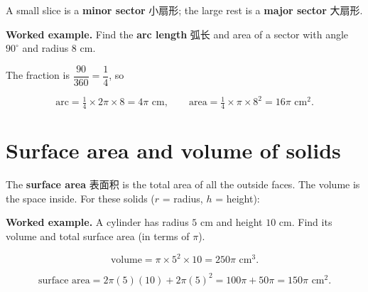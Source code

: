 \documentclass[11pt]{article}
\begin{document}
A small slice is a \textbf{minor sector} 小扇形; the large rest is a \textbf{major sector} 大扇形.

\textbf{Worked example.} Find the \textbf{arc length} 弧长 and area of a sector with angle $90^{\circ}$ and radius $8\text{ cm}$.

The fraction is $\dfrac{90}{360} = \dfrac{1}{4}$, so

\[
\text{arc} = \tfrac{1}{4} \times 2\pi \times 8 = 4\pi\text{ cm}, \qquad \text{area} = \tfrac{1}{4} \times \pi \times 8^{2} = 16\pi\text{ cm}^{2}.
\]

\section*{Surface area and volume of solids}

The \textbf{surface area} 表面积 is the total area of all the outside faces. The volume is the space inside. For these solids ($r$ = radius, $h$ = height):

\begin{center}
\end{center}

\textbf{Worked example.} A cylinder has radius $5\text{ cm}$ and height $10\text{ cm}$. Find its volume and total surface area (in terms of $\pi$).

\[
\text{volume} = \pi \times 5^{2} \times 10 = 250\pi\text{ cm}^{3}.
\]

\[
\text{surface area} = 2\pi(5)(10) + 2\pi(5)^{2} = 100\pi + 50\pi = 150\pi\text{ cm}^{2}.
\]
\end{document}
